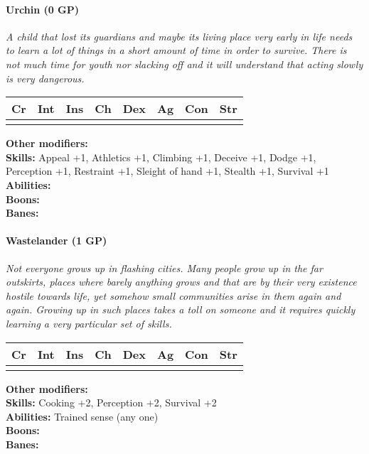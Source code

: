 \paragraph*{Urchin (0 GP)}
\textit{A child that lost its guardians and maybe its living place very early in life needs to learn a lot of things in a short amount of time in order to survive. There is not much time for youth nor slacking off and it will understand that acting slowly is very dangerous.}\par
\begin{tabular}{|l|l|l|l|l|l|l|l|}
	\hline
	Cr & Int & Ins & Ch & Dex & Ag & Con & Str \\ \hline
	&  &  &  &  &  &  &  \\ \hline
\end{tabular}\par
\noindent\textbf{Other modifiers:} \\
\textbf{Skills:} Appeal +1,
Athletics +1,
Climbing +1,
Deceive +1,
Dodge +1,
Perception +1,
Restraint +1,
Sleight of hand +1,
Stealth +1,
Survival +1\\
\textbf{Abilities:} \\
\textbf{Boons:} \\
\textbf{Banes:} \\

\hrulefill
\paragraph*{Wastelander (1 GP)}
\textit{Not everyone grows up in flashing cities. Many people grow up in the far outskirts, places where barely anything grows and that are by their very existence hostile towards life, yet somehow small communities arise in them again and again. 
	Growing up in such places takes a toll on someone and it requires quickly learning a very particular set of skills.}\par
\begin{tabular}{|l|l|l|l|l|l|l|l|}
	\hline
	Cr & Int & Ins & Ch & Dex & Ag & Con & Str \\ \hline
	&  &  &  &  &  &  &  \\ \hline
\end{tabular}\par
\noindent\textbf{Other modifiers:} \\
\textbf{Skills:} Cooking +2,
Perception +2,
Survival +2\\
\textbf{Abilities:} Trained sense (any one)\\
\textbf{Boons:} \\
\textbf{Banes:} \\

